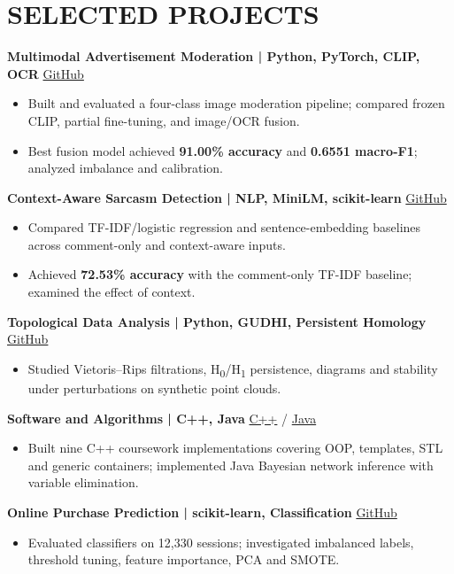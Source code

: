 \documentclass[10pt,a4paper]{article}
\begin{document}
\section*{SELECTED PROJECTS}
\textbf{Multimodal Advertisement Moderation \quad | \quad Python, PyTorch, CLIP, OCR} \hfill \href{https://github.com/naamaskital/sVLM_ads_project}{GitHub}
\begin{itemize}
\item Built and evaluated a four-class image moderation pipeline; compared frozen CLIP, partial fine-tuning, and image/OCR fusion.
\item Best fusion model achieved \textbf{91.00\% accuracy} and \textbf{0.6551 macro-F1}; analyzed imbalance and calibration.
\end{itemize}
\textbf{Context-Aware Sarcasm Detection \quad | \quad NLP, MiniLM, scikit-learn} \hfill \href{https://github.com/naamaskital/sarcasm_context_project}{GitHub}
\begin{itemize}
\item Compared TF-IDF/logistic regression and sentence-embedding baselines across comment-only and context-aware inputs.
\item Achieved \textbf{72.53\% accuracy} with the comment-only TF-IDF baseline; examined the effect of context.
\end{itemize}
\textbf{Topological Data Analysis \quad | \quad Python, GUDHI, Persistent Homology} \hfill \href{https://github.com/naamaskital/topological-data-analysis}{GitHub}
\begin{itemize}
\item Studied Vietoris--Rips filtrations, H\textsubscript{0}/H\textsubscript{1} persistence, diagrams and stability under perturbations on synthetic point clouds.
\end{itemize}
\textbf{Software and Algorithms \quad | \quad C++, Java} \hfill \href{https://github.com/naamaskital/cpp-programming-projects}{C++} / \href{https://github.com/naamaskital/bayesian-network-inference-java}{Java}
\begin{itemize}
\item Built nine C++ coursework implementations covering OOP, templates, STL and generic containers; implemented Java Bayesian network inference with variable elimination.
\end{itemize}
\textbf{Online Purchase Prediction \quad | \quad scikit-learn, Classification} \hfill \href{https://github.com/naamaskital/Online_Shoppers_Purchase_Prediction_Project}{GitHub}
\begin{itemize}
\item Evaluated classifiers on 12,330 sessions; investigated imbalanced labels, threshold tuning, feature importance, PCA and SMOTE.
\end{itemize}
\end{document}
